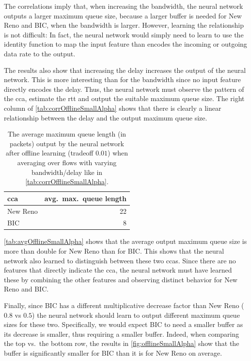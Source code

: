 \documentclass[conference]{IEEEtran}
\begin{document}
The correlations imply that, when increasing the bandwidth, the neural network outputs a larger maximum queue size, because a larger buffer is needed for New Reno and BIC, when the bandwidth is larger. However, learning the relationship is not difficult: In fact, the neural network would simply need to learn to use the identity function to map the input feature than encodes the incoming or outgoing data rate to the output. 

The results also show that increasing the delay increases the output of the neural network. This is more interesting than for the bandwidth since no input feature directly encodes the delay. Thus, the neural network must observe the pattern of the \gls{cca}, estimate the \gls{rtt} and output the suitable maximum queue size. The right column of \autoref{tab:corrOfflineSmallAlpha} shows that there is clearly a linear relationship between the delay and the output maximum queue size. 

\begin{table}[h]
\caption{The average maximum queue length (in packets) output by the neural network after offline learning (tradeoff $0.01$) when averaging over flows with varying bandwidth/delay like in \autoref{tab:corrOfflineSmallAlpha}.} \label{tab:avgOfflineSmallAlpha}
\centering
\begin{tabular}{lr} \toprule
\gls{cca} & avg.~max.~queue length \\ \midrule
New Reno & 22 \\
BIC & 8 \\
\bottomrule
\end{tabular}
\end{table}

\autoref{tab:avgOfflineSmallAlpha} shows that the average output maximum queue size is more than double for New Reno than for BIC. This shows that the neural network also learned to distinguish between these two \glspl{cca}. Since there are no features that directly indicate the \gls{cca}, the neural network must have learned these by combining the other features and observing distinct behavior for New Reno and BIC. 

Finally, since BIC has a different multiplicative decrease factor than New Reno ($0.8$ vs $0.5$) the neural network should learn to output different maximum queue sizes for these two. Specifically, we would expect BIC to need a smaller buffer as its decrease is smaller, thus requiring a smaller buffer. Indeed, when comparing the top vs.~the bottom row, the results in \autoref{fig:offlineSmallAlpha} show that the buffer is significantly smaller for BIC than it is for New Reno on average. 
\end{document}
